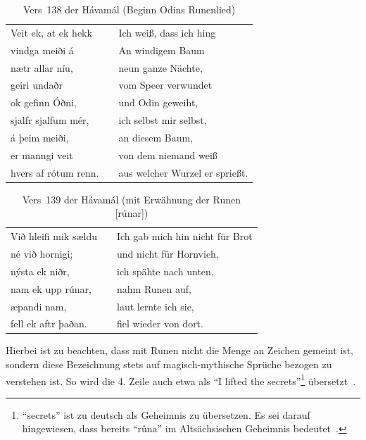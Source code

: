 \documentclass[a4paper]{scrartcl}
\begin{document}
\begin{table}[!ht]
  \begin{center}
    \begin{tabular}{lp{30pt}l}
      Veit ek, at ek hekk   && Ich weiß, dass ich hing \\
      vindga meiði á        && An windigem Baum \\
      nætr allar níu,       && neun ganze Nächte, \\
      geiri undaðr          && vom Speer verwundet \\
      ok gefinn Óðni,       && und Odin geweiht, \\
      sjalfr sjalfum mér,   && ich selbst mir selbst, \\
      á þeim meiði,         && an diesem Baum, \\
      er manngi veit        && von dem niemand weiß \\
      hvers af rótum renn.  && aus welcher Wurzel er sprießt.
    \end{tabular}
    \caption{Vers~138 der Hávamál (Beginn Odins Runenlied)}
  \end{center}
\end{table}
%
\begin{table}[!ht]
  \begin{center}
    \begin{tabular}{lp{30pt}l}
      Við hleifi mik sældu  && Ich gab mich hin nicht für Brot \\
      né við hornigi;       && und nicht für Hornvieh, \\
      nýsta ek niðr,        && ich spähte nach unten, \\
      nam ek upp rúnar,     && nahm Runen auf, \\
      æpandi nam,           && laut lernte ich sie, \\
      fell ek aftr þaðan.   && fiel wieder von dort.
    \end{tabular}
    \caption{Vers~139 der Hávamál (mit Erwähnung der Runen [rúnar])}
  \end{center}
\end{table}

Hierbei ist zu beachten, dass mit Runen nicht die Menge an Zeichen gemeint ist, sondern diese Bezeichnung stets auf magisch-mythische Sprüche bezogen zu verstehen ist. So wird die 4. Zeile auch etwa als \enquote{I lifted the secrets}\footnote{\enquote{secrets} ist zu deutsch als Geheimnis zu übersetzen. Es sei darauf hingewiesen, dass bereits \enquote{rûna} im Altsächsischen Geheimnis bedeutet~\cite[S. 1]{düwel}.} übersetzt~\cite{havamal-vers-139}.
\end{document}
